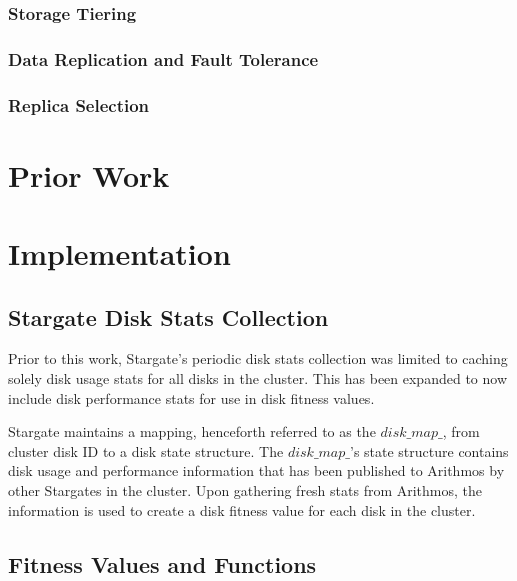 \documentclass[12pt]{article}
\begin{document}
    \subsubsection{Storage Tiering}


    \subsubsection{Data Replication and Fault Tolerance}


    \subsubsection{Replica Selection}


\section{Prior Work}



\section{Implementation}

  \subsection{Stargate Disk Stats Collection}

  Prior to this work, Stargate's periodic disk stats collection was limited to
  caching solely disk usage stats for all disks in the cluster.  This has been
  expanded to now include disk performance stats for use in disk fitness
  values.

  Stargate maintains a mapping, henceforth referred to as the $disk\_map\_$,
  from cluster disk ID to a disk state structure. The $disk\_map\_$'s state
  structure contains disk usage and performance information that has been
  published to Arithmos by other Stargates in the cluster. Upon gathering fresh
  stats from Arithmos, the information is used to create a disk fitness value
  for each disk in the cluster.

  \subsection{Fitness Values and Functions}
\end{document}
